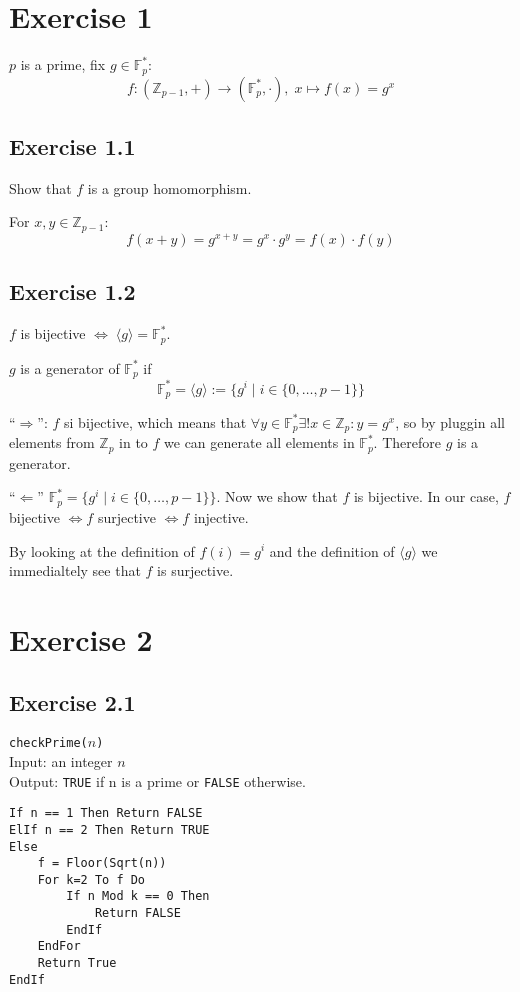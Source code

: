 \documentclass[a4paper]{scrreprt}
\newcommand\Z{\mathbb Z}
\newcommand\F{\mathbb F}
\begin{document}
\section*{Exercise 1}

$p$ is a prime, fix $g\in\F_p^\ast$:
\[f:(\Z_{p-1},+)\rightarrow(\F_p^\ast,\cdot),\;x\mapsto f(x)=g^x\]

\subsection*{Exercise 1.1}
Show that $f$ is a group homomorphism.

For $x,y\in\Z_{p-1}$:
\[f(x+y)=g^{x+y}=g^x\cdot g^y=f(x)\cdot f(y)\]

\subsection*{Exercise 1.2}
    $f$ is bijective $\Leftrightarrow\;\langle g\rangle=\F^\ast_p$.

$g$ is a generator of $\F_p^\ast$ if 
\[\F_p^\ast=\langle g\rangle:=\{g^i\mid i\in\{0,\hdots,p-1\}\}\]

``$\Rightarrow$'': $f$ si bijective, which means that 
$\forall y\in\F_p^\ast\exists!x\in\Z_p:y=g^x$, so by pluggin all elements from $\Z_p$ in to
$f$ we can generate all elements in $\F_p^\ast$. Therefore $g$ is a generator.

``$\Leftarrow$'' $\F_p^\ast=\{g^i\mid i\in\{0,\hdots,p-1\}\}$. Now we show that $f$ is bijective.
In our case, $f$ bijective $\Leftrightarrow f$ surjective $\Leftrightarrow f$ injective.

By looking at the definition of $f(i)=g^i$ and the definition of $\langle g\rangle$ we
immedialtely see that $f$ is surjective.


\section*{Exercise 2}
\subsection*{Exercise 2.1}
\texttt{checkPrime($n$)}\\
Input: an integer $n$\\
Output: \texttt{TRUE} if n is a prime or \texttt{FALSE} otherwise.

\begin{lstlisting}
If n == 1 Then Return FALSE
ElIf n == 2 Then Return TRUE
Else
    f = Floor(Sqrt(n))
    For k=2 To f Do
        If n Mod k == 0 Then
            Return FALSE
        EndIf
    EndFor
    Return True
EndIf
\end{lstlisting}
\end{document}
